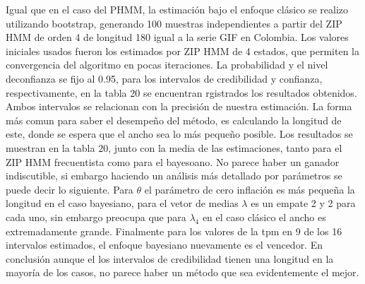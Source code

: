 \documentclass[a4paper]{article}\usepackage[]{graphicx}\usepackage[]{color}
\begin{document}
Igual que en el caso del PHMM, la estimación bajo el enfoque clásico se realizo utilizando bootstrap, generando 100 muestras independientes a partir del ZIP HMM de orden 4 de longitud 180 igual a la serie GIF en Colombia. Los valores iniciales usados fueron los estimados por ZIP HMM de 4 estados, que permiten la convergencia del algoritmo en pocas iteraciones. La probabilidad y el nivel deconfianza se fijo al 0.95, para los intervalos de credibilidad y confianza, respectivamente, en la tabla 20 se encuentran rgistrados los resultados obtenidos.
\\
Ambos intervalos se relacionan con la precisión de nuestra estimación. La forma más comun para saber el desempeño del método, es calculando la longitud de este, donde se espera que el ancho sea lo más pequeño posible. Los resultados se muestran en la tabla 20, junto con la media de las estimaciones, tanto para el ZIP HMM frecuentista como para el bayesoano. No parece haber un ganador indiscutible, si embargo haciendo un análisis más detallado por parámetros se puede decir lo siguiente. Para $\theta$ el parámetro de cero inflación es más pequeña la longitud en el caso bayesiano, para el vetor de medias $\lambda$ es un empate 2 y 2 para cada uno, sin embargo preocupa que para $\lambda_4$ en el caso clásico el ancho es extremadamente grande. Finalmente para los valores de la tpm en 9 de los 16 intervalos estimados, el enfoque bayesiano nuevamente es el vencedor. En conclusión aunque el los intervalos de credibilidad tienen una longitud en la mayoría de los casos, no parece haber un método que sea evidentemente el mejor.
\end{document}
